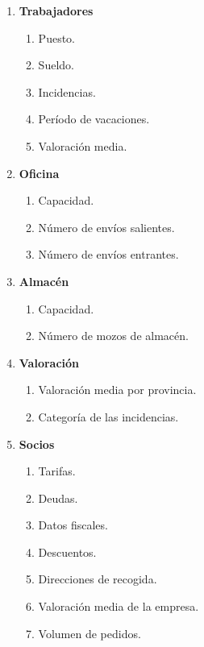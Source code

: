 \documentclass[12pt,spanish]{article}
\begin{document}
\begin{enumerate}[label=\textbf{RI-\arabic*}]
	\item \textbf{Trabajadores}
	\begin{enumerate}[label=\textbf{RI-3.\arabic*}]
		\item Puesto.
		\item Sueldo.
		\item Incidencias.
		\item Período de vacaciones.
		\item Valoración media.
	\end{enumerate}	
	\item \textbf{Oficina}
	\begin{enumerate}[label=\textbf{RI-4.\arabic*}]
		\item Capacidad.
		\item Número de envíos salientes.
		\item Número de envíos entrantes.
	\end{enumerate}		
	\item \textbf{Almacén}
		\begin{enumerate}[label=\textbf{RI-5.\arabic*}]
			\item Capacidad.
			\item Número de mozos de almacén.
		\end{enumerate}	
	\item \textbf{Valoración}
		\begin{enumerate}[label=\textbf{RI-6.\arabic*}]
			\item Valoración media por provincia.
			\item Categoría de las incidencias.
		\end{enumerate}	
	\item \textbf{Socios}
			\begin{enumerate}[label=\textbf{RI-7.\arabic*}]
			\item Tarifas.
			\item Deudas.
			\item Datos fiscales.
			\item Descuentos.
			\item Direcciones de recogida.
			\item Valoración media de la empresa.
			\item Volumen de pedidos.
		\end{enumerate}	
\end{enumerate}
\end{document}
